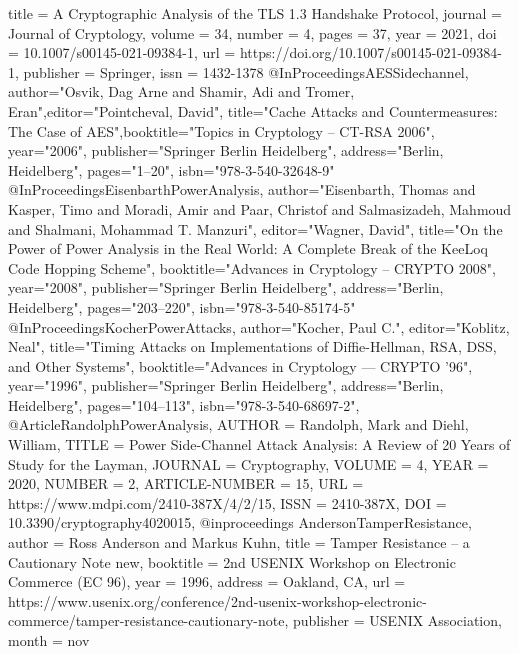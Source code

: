 \documentclass[english, version-2020-11]{uzl-thesis}
\begin{document}
\begin{bibtex-entries}
{      title   = {A Cryptographic Analysis of the {TLS} 1.3 Handshake Protocol},
      journal = {Journal of Cryptology},
      volume  = {34},
      number  = {4},
      pages   = {37},
      year    = {2021},
      doi     = {10.1007/s00145-021-09384-1},
      url     = {https://doi.org/10.1007/s00145-021-09384-1},
      publisher = {Springer},
      issn    = {1432-1378}
    }
    @InProceedings{AESSidechannel,
      author="Osvik, Dag Arne and Shamir, Adi and Tromer, Eran",editor="Pointcheval, David",
      title="Cache Attacks and Countermeasures: The Case of AES",booktitle="Topics in Cryptology -- CT-RSA 2006",
      year="2006",
      publisher="Springer Berlin Heidelberg",
      address="Berlin, Heidelberg",
      pages="1--20",
      isbn="978-3-540-32648-9"
    }
    @InProceedings{EisenbarthPowerAnalysis,
      author="Eisenbarth, Thomas and Kasper, Timo and Moradi, Amir and Paar, Christof and Salmasizadeh, Mahmoud and Shalmani, Mohammad T. Manzuri",
      editor="Wagner, David",
      title="On the Power of Power Analysis in the Real World: A Complete Break of the KeeLoq Code Hopping Scheme",
      booktitle="Advances in Cryptology -- CRYPTO 2008",
      year="2008",
      publisher="Springer Berlin Heidelberg",
      address="Berlin, Heidelberg",
      pages="203--220",
      isbn="978-3-540-85174-5"
    }  
    @InProceedings{KocherPowerAttacks,
      author="Kocher, Paul C.",
      editor="Koblitz, Neal",
      title="Timing Attacks on Implementations of Diffie-Hellman, RSA, DSS, and Other Systems",
      booktitle="Advances in Cryptology --- CRYPTO '96",
      year="1996",
      publisher="Springer Berlin Heidelberg",
      address="Berlin, Heidelberg",
      pages="104--113",
      isbn="978-3-540-68697-2",
    }
    @Article{RandolphPowerAnalysis,
    AUTHOR = {Randolph, Mark and Diehl, William},
    TITLE = {Power Side-Channel Attack Analysis: A Review of 20 Years of Study for the Layman},
    JOURNAL = {Cryptography},
    VOLUME = {4},
    YEAR = {2020},
    NUMBER = {2},
    ARTICLE-NUMBER = {15},
    URL = {https://www.mdpi.com/2410-387X/4/2/15},
    ISSN = {2410-387X},
    DOI = {10.3390/cryptography4020015},
  }
  @inproceedings {AndersonTamperResistance,
    author = {Ross Anderson and Markus Kuhn},
    title = {Tamper Resistance -- a Cautionary Note new},
    booktitle = {2nd USENIX Workshop on Electronic Commerce (EC 96)},
    year = {1996},
    address = {Oakland, CA},
    url = {https://www.usenix.org/conference/2nd-usenix-workshop-electronic-commerce/tamper-resistance-cautionary-note},
    publisher = {USENIX Association},
    month = nov
}
\end{bibtex-entries}
\end{document}
